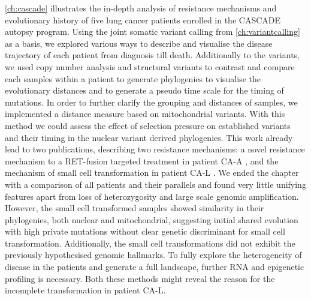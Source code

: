 \autoref{ch:cascade} illustrates the in-depth analysis of resistance mechanisms and evolutionary history of five lung cancer patients enrolled in the CASCADE autopsy program. Using the joint somatic variant calling from \autoref{ch:variantcalling} as a basis, we explored various ways to describe and visualise the disease trajectory of each patient from diagnosis till death. Additionally to the variants, we used copy number analysis and structural variants to contrast and compare each samples within a patient to generate phylogenies to visualise the evolutionary distances and to generate a pseudo time scale for the timing of mutations. In order to further clarify the grouping and distances of samples, we implemented a distance measure based on mitochondrial variants. With this method we could assess the effect of selection pressure on established variants and their timing in the nuclear variant derived phylogenies. This work already lead to two publications, describing two resistance mechanisms: a novel resistance mechanism to a RET-fusion targeted treatment in patient CA-A \cite{Solomon2020}, and the mechanism of small cell transformation in patient CA-L \cite{Burr2019}. We ended the chapter with a comparison of all patients and their parallels and found very little unifying features apart from loss of heterozygosity and large scale genomic amplification. However, the small cell transformed samples showed similarity in their phylogenies, both nuclear and mitochondrial, suggesting initial shared evolution with high private mutations without clear genetic discriminant for small cell transformation. Additionally, the small cell transformations did not exhibit the previously hypothesised genomic hallmarks. To fully explore the heterogeneity of disease in the patients and generate a full landscape, further RNA and epigenetic profiling is necessary. Both these methods might reveal the reason for the incomplete transformation in patient CA-L.

